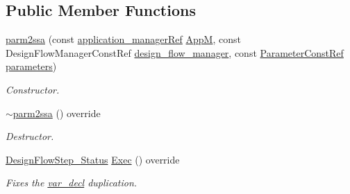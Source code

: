 \subsection*{Public Member Functions}
\begin{DoxyCompactItemize}
\item 
\hyperlink{classparm2ssa_aea62eab6928519e95df8a544661df5a3}{parm2ssa} (const \hyperlink{application__manager_8hpp_a04ccad4e5ee401e8934306672082c180}{application\+\_\+manager\+Ref} \hyperlink{classFrontendFlowStep_a0ac0d8db2a378416583f51c4faa59d15}{AppM}, const Design\+Flow\+Manager\+Const\+Ref \hyperlink{classDesignFlowStep_ab770677ddf087613add30024e16a5554}{design\+\_\+flow\+\_\+manager}, const \hyperlink{Parameter_8hpp_a37841774a6fcb479b597fdf8955eb4ea}{Parameter\+Const\+Ref} \hyperlink{classDesignFlowStep_a802eaafe8013df706370679d1a436949}{parameters})
\begin{DoxyCompactList}\small\item\em Constructor. \end{DoxyCompactList}\item 
\hyperlink{classparm2ssa_abd777e7c92f2b7c714bd73422a11c9af}{$\sim$parm2ssa} () override
\begin{DoxyCompactList}\small\item\em Destructor. \end{DoxyCompactList}\item 
\hyperlink{design__flow__step_8hpp_afb1f0d73069c26076b8d31dbc8ebecdf}{Design\+Flow\+Step\+\_\+\+Status} \hyperlink{classparm2ssa_ae308e612abcdd8e6cb9dcf490e774065}{Exec} () override
\begin{DoxyCompactList}\small\item\em Fixes the \hyperlink{structvar__decl}{var\+\_\+decl} duplication. \end{DoxyCompactList}\end{DoxyCompactItemize}
